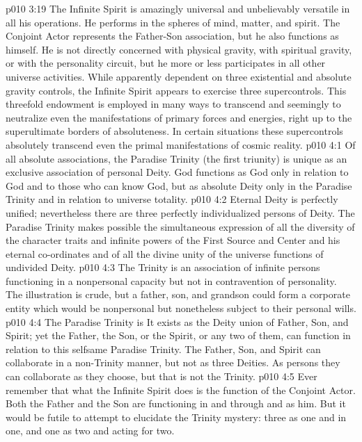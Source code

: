 \vs p010 3:19 \pc The Infinite Spirit is amazingly universal and unbelievably versatile in all his operations. He performs in the spheres of mind, matter, and spirit. The Conjoint Actor represents the Father\hyp{}Son association, but he also functions as himself. He is not directly concerned with physical gravity, with spiritual gravity, or with the personality circuit, but he more or less participates in all other universe activities. While apparently dependent on three existential and absolute gravity controls, the Infinite Spirit appears to exercise three supercontrols. This threefold endowment is employed in many ways to transcend and seemingly to neutralize even the manifestations of primary forces and energies, right up to the superultimate borders of absoluteness. In certain situations these supercontrols absolutely transcend even the primal manifestations of cosmic reality.
\vs p010 4:1 Of all absolute associations, the Paradise Trinity (the first triunity) is unique as an exclusive association of personal Deity. God functions as God only in relation to God and to those who can know God, but as absolute Deity only in the Paradise Trinity and in relation to universe totality.
\vs p010 4:2 \pc Eternal Deity is perfectly unified; nevertheless there are three perfectly individualized persons of Deity. The Paradise Trinity makes possible the simultaneous expression of all the diversity of the character traits and infinite powers of the First Source and Center and his eternal co\hyp{}ordinates and of all the divine unity of the universe functions of undivided Deity.
\vs p010 4:3 The Trinity is an association of infinite persons functioning in a nonpersonal capacity but not in contravention of personality. The illustration is crude, but a father, son, and grandson could form a corporate entity which would be nonpersonal but nonetheless subject to their personal wills.
\vs p010 4:4 The Paradise Trinity is  It exists as the Deity union of Father, Son, and Spirit; yet the Father, the Son, or the Spirit, or any two of them, can function in relation to this selfsame Paradise Trinity. The Father, Son, and Spirit can collaborate in a non\hyp{}Trinity manner, but not as three Deities. As persons they can collaborate as they choose, but that is not the Trinity.
\vs p010 4:5 \pc Ever remember that what the Infinite Spirit does is the function of the Conjoint Actor. Both the Father and the Son are functioning in and through and as him. But it would be futile to attempt to elucidate the Trinity mystery: three as one and in one, and one as two and acting for two.
